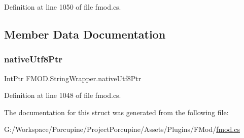 Definition at line 1050 of file fmod.\+cs.



\subsection{Member Data Documentation}
\mbox{\label{struct_f_m_o_d_1_1_string_wrapper_ad1f3b3d96cb7ea8ced9d56d6d47aaf97}} 
\subsubsection{\texorpdfstring{native\+Utf8\+Ptr}{nativeUtf8Ptr}}
{\footnotesize\ttfamily Int\+Ptr F\+M\+O\+D.\+String\+Wrapper.\+native\+Utf8\+Ptr}



Definition at line 1048 of file fmod.\+cs.



The documentation for this struct was generated from the following file\+:\begin{DoxyCompactItemize}
\item 
G\+:/\+Workspace/\+Porcupine/\+Project\+Porcupine/\+Assets/\+Plugins/\+F\+Mod/\hyperlink{fmod_8cs}{fmod.\+cs}\end{DoxyCompactItemize}
